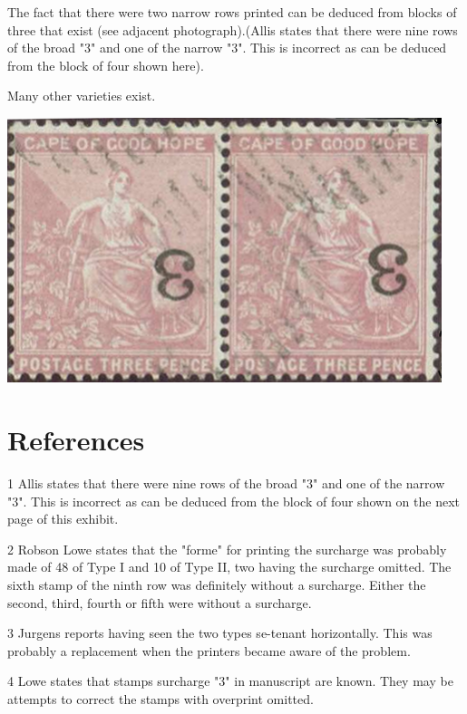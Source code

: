 The fact that there were two narrow rows printed can be deduced from 
blocks of three that exist (see adjacent photograph).(Allis states that 
there were nine rows of the broad "3" and one of the narrow "3". 
This is incorrect as can be deduced from the block of  four shown here).

Many other varieties exist.

\begin{marginfigure}
\includegraphics[width=0.95\textwidth]{../cape-of-good-hope/images/3-ON-THREE-IMAGES/3-pair-inverted.png}
\end{marginfigure}


\section{References}


1 Allis states that there were nine rows of the broad "3" and one of 
the narrow "3". This is incorrect as can be deduced from the block of  
four shown on the next page of this exhibit.


2 Robson Lowe states that the "forme" for printing the surcharge was 
probably made of 48 of Type I and 10 of Type II, two having  the surcharge omitted. 
The sixth stamp of the ninth row was definitely without a surcharge. 
Either the second, third, fourth or fifth  were without a surcharge.


3 Jurgens reports having seen the two types se-tenant horizontally. This 
was probably a replacement when the printers became  aware of the problem.


4 Lowe states that stamps surcharge "3" in manuscript are known. They may 
be attempts to correct the stamps with overprint omitted. 

                    
